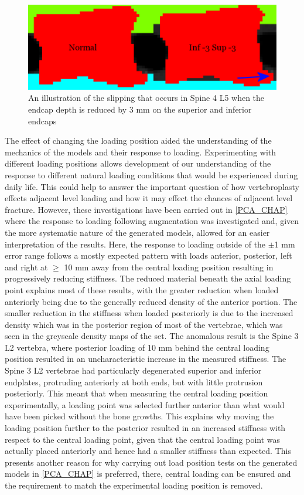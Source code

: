 \begin{figure}[h!] \centering
	\includegraphics[width=.65\textwidth]{Chapters/Chapter_HT_images/EC-3slip.png}
	\caption{An illustration of the slipping that occurs in Spine 4 L5 when
	the endcap depth is reduced by 3 mm on the superior and inferior
endcaps} \label{fig:EC-3slip} \end{figure}

The effect of changing the loading position aided the understanding of the
mechanics of the models and their response to loading. Experimenting with
different loading positions allows development of our understanding of the
response to different natural loading conditions that would be experienced
during daily life. This could help to answer the important question of how
vertebroplasty effects adjacent level loading and how it may effect the chances
of adjacent level fracture. However, these investigations have been carried out
in \cref{PCA_CHAP} where the response to loading following augmentation was
investigated and, given the more systematic nature of the generated models,
allowed for an easier interpretation of the results. Here, the response to
loading outside of the $\pm$1 mm error range follows a mostly expected pattern
with loads anterior, posterior, left and right at $\geq$ 10 mm away from the
central loading position resulting in progressively reducing stiffness. The
reduced material beneath the axial loading point explains most of these
results, with the greater reduction when loaded anteriorly being due to the
generally reduced density of the anterior portion. The smaller reduction in the
stiffness when loaded posteriorly is due to the increased density which was in
the posterior region of most of the vertebrae, which was seen in the greyscale
density maps of the set. The anomalous result is the Spine 3 L2 vertebra, where
posterior loading of 10 mm behind the central loading position resulted in an
uncharacteristic increase in the measured stiffness.  The Spine 3 L2 vertebrae
had particularly degenerated superior and inferior endplates, protruding
anteriorly at both ends, but with little protrusion posteriorly.  This meant
that when measuring the central loading position experimentally, a loading
point was selected further anterior than what would have been picked without
the bone growths. This explains why moving the loading position further to the
posterior resulted in an increased stiffness with respect to the central
loading point, given that the central loading point was actually placed
anteriorly and hence had a smaller stiffness than expected.  This presents
another reason for why carrying out load position tests on the generated models
in \cref{PCA_CHAP} is preferred, there, central loading can be ensured and the
requirement to match the experimental loading position is removed.


